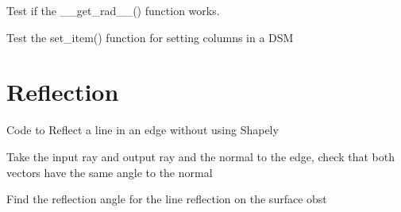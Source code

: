 \documentclass[letterpaper,10pt,english]{sphinxmanual}
\begin{document}
\begin{fulllineitems}
\label{\detokenize{index:DictionarySparseMatrix.test_21}}
Test if the \_\_get\_rad\_\_() function works.

\end{fulllineitems}


\begin{fulllineitems}
\label{\detokenize{index:DictionarySparseMatrix.test_22}}
Test the set\_item() function for setting columns in a DSM

\end{fulllineitems}



\chapter{Reflection}
\label{\detokenize{index:module-reflection}}\label{\detokenize{index:reflection}}
Code to Reflect a line in an edge without using Shapely

\begin{fulllineitems}
\label{\detokenize{index:reflection.errorcheck}}
Take the input ray and output ray and the normal to the edge,
check that both vectors have the same angle to the normal

\end{fulllineitems}


\begin{fulllineitems}
\label{\detokenize{index:reflection.refangle}}
Find the reflection angle for the line reflection on the surface obst

\end{fulllineitems}
\end{document}
